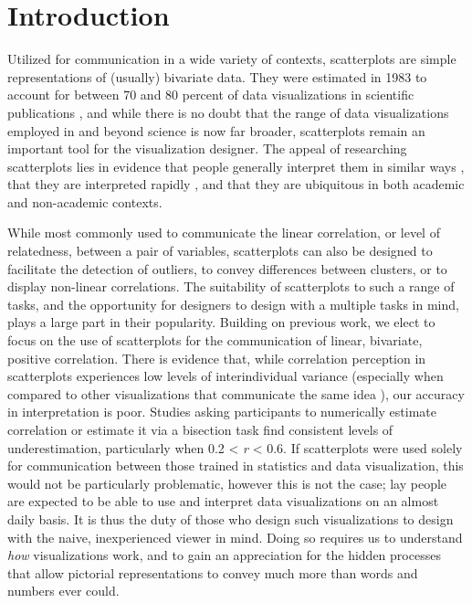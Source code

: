 \documentclass[manuscript,screen,review]{acmart}
\begin{document}
\setlength{\parskip}{-0.1pt}

\section{Introduction}\label{sec-intro}

Utilized for communication in a wide variety of contexts, scatterplots
are simple representations of (usually) bivariate data. They were
estimated in 1983 to account for between 70 and 80 percent of data
visualizations in scientific publications \citep{tufte_1986}, and while
there is no doubt that the range of data visualizations employed in and
beyond science is now far broader, scatterplots remain an important tool
for the visualization designer. The appeal of researching scatterplots
lies in evidence that people generally interpret them in similar ways
\citep{kay_2015}, that they are interpreted rapidly
\citep{rensink_2014}, and that they are ubiquitous in both academic
\citep{tufte_1986} and non-academic contexts.

While most commonly used to communicate the linear correlation, or level
of relatedness, between a pair of variables, scatterplots can also be
designed to facilitate the detection of outliers, to convey differences
between clusters, or to display non-linear correlations. The suitability
of scatterplots to such a range of tasks, and the opportunity for
designers to design with a multiple tasks in mind, plays a large part in
their popularity. Building on previous work, we elect to focus on the
use of scatterplots for the communication of linear, bivariate, positive
correlation. There is evidence that, while correlation perception in
scatterplots experiences low levels of interindividual variance
(especially when compared to other visualizations that communicate the
same idea \citep{harrison_2014, kay_2015}), our accuracy in
interpretation is poor. Studies asking participants to numerically
estimate correlation
\citep{strahan_1978, bobko_1979, cleveland_1982, lane_1985, lauer_1989, collyer_1990, meyer_1992}
or estimate it via a bisection task \citep{rensink_2017} find consistent
levels of underestimation, particularly when 0.2 \textless{} \emph{r}
\textless{} 0.6. If scatterplots were used solely for communication
between those trained in statistics and data visualization, this would
not be particularly problematic, however this is not the case; lay
people are expected to be able to use and interpret data visualizations
on an almost daily basis. It is thus the duty of those who design such
visualizations to design with the naive, inexperienced viewer in mind.
Doing so requires us to understand \emph{how} visualizations work, and
to gain an appreciation for the hidden processes that allow pictorial
representations to convey much more than words and numbers ever could.
\end{document}
